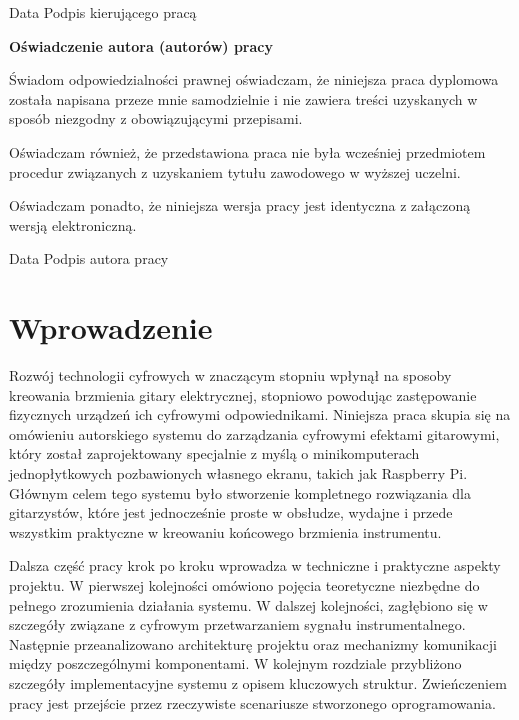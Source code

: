 \documentclass[12pt,a4paper]{report}
\begin{document}
\vspace{2cm}
\noindent Data \hfill Podpis kierującego pracą\hspace*{1cm} %

\vspace{3cm}

{\noindent\Large\bfseries Oświadczenie autora (autorów) pracy\par}
\vspace{0.8cm}

\indent Świadom odpowiedzialności prawnej oświadczam, że niniejsza
praca dyplomowa została napisana przeze mnie samodzielnie i nie
zawiera treści uzyskanych w sposób niezgodny z obowiązującymi przepisami.

Oświadczam również, że przedstawiona praca nie była wcześniej
przedmiotem procedur związanych z uzyskaniem tytułu zawodowego w
wyższej uczelni.

Oświadczam ponadto, że niniejsza wersja pracy jest identyczna z
załączoną wersją elektroniczną.

\vspace{2cm}
\noindent Data \hfill Podpis autora pracy\hspace*{1cm}

\newpage

\tableofcontents
\newpage

\chapter*{Wprowadzenie}
Rozwój technologii cyfrowych w znaczącym stopniu wpłynął na sposoby
kreowania brzmienia gitary elektrycznej, stopniowo powodując
zastępowanie fizycznych urządzeń ich cyfrowymi odpowiednikami.
Niniejsza praca skupia się na omówieniu autorskiego systemu do
zarządzania cyfrowymi efektami gitarowymi, który został
zaprojektowany specjalnie z myślą o minikomputerach jednopłytkowych
pozbawionych własnego ekranu, takich jak Raspberry Pi. Głównym celem
tego systemu było stworzenie kompletnego rozwiązania dla gitarzystów,
które jest jednocześnie proste w obsłudze, wydajne i przede wszystkim
praktyczne w kreowaniu końcowego brzmienia instrumentu.

Dalsza część pracy krok po kroku wprowadza w techniczne i praktyczne
aspekty projektu. W pierwszej kolejności omówiono pojęcia teoretyczne
niezbędne do pełnego zrozumienia działania systemu. W dalszej kolejności,
zagłębiono się w szczegóły związane z cyfrowym przetwarzaniem sygnału
instrumentalnego. Następnie przeanalizowano architekturę projektu oraz
mechanizmy komunikacji między
poszczególnymi komponentami. W kolejnym rozdziale przybliżono
szczegóły implementacyjne systemu z opisem kluczowych struktur.
Zwieńczeniem pracy jest przejście przez rzeczywiste scenariusze
stworzonego oprogramowania.
\end{document}
